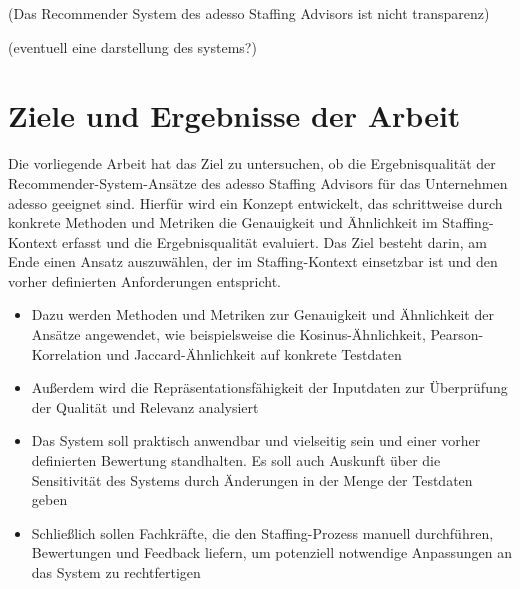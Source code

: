 (Das Recommender System des adesso Staffing Advisors ist nicht transparenz) 

(eventuell eine darstellung des systems?)
\newpage
\section{Ziele und Ergebnisse der Arbeit}
\label{sec:zieleundergebnis}
Die vorliegende Arbeit hat das Ziel zu untersuchen, ob die Ergebnisqualität der Recommender-System-Ansätze des adesso Staffing Advisors für das Unternehmen adesso geeignet sind. Hierfür wird ein Konzept entwickelt, das schrittweise durch konkrete Methoden und Metriken die Genauigkeit und Ähnlichkeit im Staffing-Kontext erfasst und die Ergebnisqualität evaluiert. Das Ziel besteht darin, am Ende einen Ansatz auszuwählen, der im Staffing-Kontext einsetzbar ist und den vorher definierten Anforderungen entspricht. 
\begin{itemize}
	\item Dazu werden Methoden und Metriken zur Genauigkeit und Ähnlichkeit der Ansätze angewendet, wie beispielsweise die Kosinus-Ähnlichkeit, Pearson-Korrelation und Jaccard-Ähnlichkeit auf konkrete Testdaten 
	\item Außerdem wird die Repräsentationsfähigkeit der Inputdaten zur Überprüfung der Qualität und Relevanz analysiert
	\item Das System soll praktisch anwendbar und vielseitig sein und einer vorher definierten Bewertung standhalten. Es soll auch Auskunft über die Sensitivität des Systems durch Änderungen in der Menge der Testdaten geben
	\item  Schließlich sollen Fachkräfte, die den Staffing-Prozess manuell durchführen, Bewertungen und Feedback liefern, um potenziell notwendige Anpassungen an das System zu rechtfertigen
\end{itemize}
\newpage



